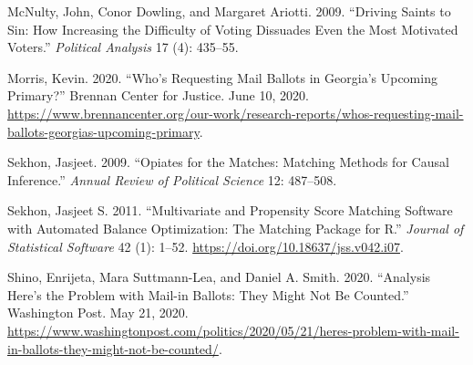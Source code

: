 \documentclass[
  12pt,
]{article}
\newlength{\cslhangindent}
\newenvironment{cslreferences}%
  {\setlength{\parindent}{0pt}%
  \everypar{\setlength{\hangindent}{\cslhangindent}}\ignorespaces}%
  {\par}
\begin{document}
\begin{cslreferences}
\leavevmode\hypertarget{ref-McNulty2009}{}%
McNulty, John, Conor Dowling, and Margaret Ariotti. 2009. ``Driving Saints to Sin: How Increasing the Difficulty of Voting Dissuades Even the Most Motivated Voters.'' \emph{Political Analysis} 17 (4): 435--55.

\leavevmode\hypertarget{ref-Morris2020}{}%
Morris, Kevin. 2020. ``Who's Requesting Mail Ballots in Georgia's Upcoming Primary?'' Brennan Center for Justice. June 10, 2020. \url{https://www.brennancenter.org/our-work/research-reports/whos-requesting-mail-ballots-georgias-upcoming-primary}.

\leavevmode\hypertarget{ref-Sekhon2009}{}%
Sekhon, Jasjeet. 2009. ``Opiates for the Matches: Matching Methods for Causal Inference.'' \emph{Annual Review of Political Science} 12: 487--508.

\leavevmode\hypertarget{ref-Sekhon2011}{}%
Sekhon, Jasjeet S. 2011. ``Multivariate and Propensity Score Matching Software with Automated Balance Optimization: The Matching Package for R.'' \emph{Journal of Statistical Software} 42 (1): 1--52. \url{https://doi.org/10.18637/jss.v042.i07}.

\leavevmode\hypertarget{ref-Shino2020}{}%
Shino, Enrijeta, Mara Suttmann-Lea, and Daniel A. Smith. 2020. ``Analysis \textbar{} Here's the Problem with Mail-in Ballots: They Might Not Be Counted.'' Washington Post. May 21, 2020. \url{https://www.washingtonpost.com/politics/2020/05/21/heres-problem-with-mail-in-ballots-they-might-not-be-counted/}.
\end{cslreferences}
\end{document}
